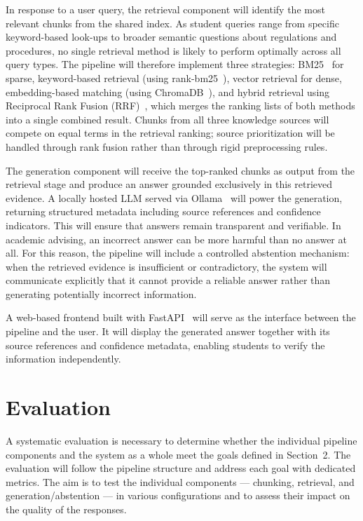 \documentclass[10pt,twocolumn]{article}
\begin{document}
In response to a user query, the retrieval component will identify the most relevant chunks from the shared index. As student queries range from specific keyword-based look-ups to broader semantic questions about regulations and procedures, no single retrieval method is likely to perform optimally across all query types. The pipeline will therefore implement three strategies: BM25~\cite{robertson2009bm25} for sparse, keyword-based retrieval (using rank-bm25~\cite{rank_bm25_pypi}), vector retrieval for dense, embedding-based matching (using ChromaDB~\cite{chroma_docs}), and hybrid retrieval using Reciprocal Rank Fusion (RRF)~\cite{cormack2009rrf}, which merges the ranking lists of both methods into a single combined result. Chunks from all three knowledge sources will compete on equal terms in the retrieval ranking; source prioritization will be handled through rank fusion rather than through rigid preprocessing rules.

The generation component will receive the top-ranked chunks as output from the retrieval stage and produce an answer grounded exclusively in this retrieved evidence. A locally hosted LLM served via Ollama~\cite{ollama_api_docs} will power the generation, returning structured metadata including source references and confidence indicators. This will ensure that answers remain transparent and verifiable. In academic advising, an incorrect answer can be more harmful than no answer at all. For this reason, the pipeline will include a controlled abstention mechanism: when the retrieved evidence is insufficient or contradictory, the system will communicate explicitly that it cannot provide a reliable answer rather than generating potentially incorrect information.

A web-based frontend built with FastAPI~\cite{fastapi_docs} will serve as the interface between the pipeline and the user. It will display the generated answer together with its source references and confidence metadata, enabling students to verify the information independently.

\section{Evaluation}

A systematic evaluation is necessary to determine whether the individual pipeline components and the system as a whole meet the goals defined in Section~2. The evaluation will follow the pipeline structure and address each goal with dedicated metrics. The aim is to test the individual components --- chunking, retrieval, and generation/abstention --- in various configurations and to assess their impact on the quality of the responses.
\end{document}
